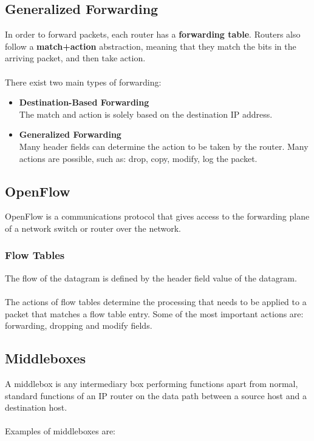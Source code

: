 \documentclass{article}
\begin{document}
\subsection{Generalized Forwarding}
In order to forward packets, each router has a \textbf{forwarding table}. Routers also follow a \textbf{match+action} abstraction, meaning that they match the bits in the arriving packet, and then take action. \\ \\
There exist two main types of forwarding:

\begin{itemize}
	\item \textbf{Destination-Based Forwarding}
	\vspace{.2cm} \\
	The match and action is solely based on the destination IP address.
	
	\item \textbf{Generalized Forwarding}
	\vspace{.2cm} \\
	Many header fields can determine the action to be taken by the router. Many actions are possible, such as: drop, copy, modify, log the packet.
\end{itemize}

\subsection{OpenFlow}
OpenFlow is a communications protocol that gives access to the forwarding plane of a network switch or router over the network.

\subsubsection{Flow Tables}
The flow of the datagram is defined by the header field value of the datagram. \\ \\
The actions of flow tables determine the processing that needs to be applied to a packet that matches a flow table entry. Some of the most important actions are: forwarding, dropping and modify fields.

\subsection{Middleboxes}
A middlebox is any intermediary box performing functions apart from normal, standard functions of an IP router on the data path between a source host and a destination host. \\ \\
Examples of middleboxes are:
\end{document}
